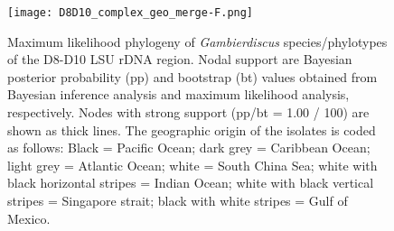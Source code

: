 \documentclass[12pt]{article}
\begin{document}
\newpage
\begin{figure} 
\texttt{[image: D8D10\_complex\_geo\_merge-F.png]} 
\caption{Maximum likelihood phylogeny of \textit{Gambierdiscus} species/phylotypes of the D8-D10 LSU rDNA region. Nodal support are Bayesian posterior probability (pp) and bootstrap (bt) values obtained from Bayesian inference analysis and maximum likelihood analysis, respectively. Nodes with strong support (pp/bt = 1.00 / 100) are shown as thick lines. The geographic origin of the isolates is coded as follows: Black = Pacific Ocean; dark grey = Caribbean Ocean; light grey = Atlantic Ocean; white = South China Sea; white with black horizontal stripes = Indian Ocean; white with black vertical stripes = Singapore strait; black with white stripes = Gulf of Mexico.} 
\label{fig:HGD8D10}
\end{figure} 
\FloatBarrier 
\newpage


\end{document}
